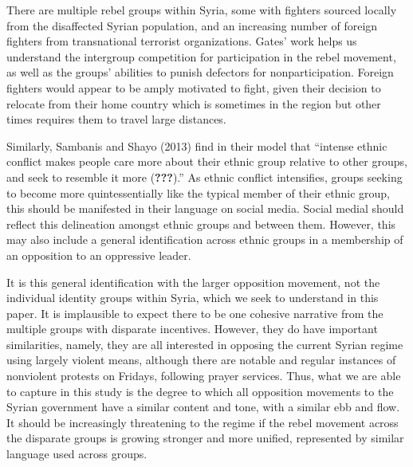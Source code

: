 \documentclass[english,man]{apa6}
\begin{document}
There are multiple rebel groups within Syria, some with fighters sourced locally from the disaffected Syrian population, and an increasing number of foreign fighters from transnational terrorist organizations. Gates' work helps us understand the intergroup competition for participation in the rebel movement, as well as the groups' abilities to punish defectors for nonparticipation. Foreign fighters would appear to be amply motivated to fight, given their decision to relocate from their home country which is sometimes in the region but other times requires them to travel large distances.

Similarly, Sambanis and Shayo (2013) find in their model that \enquote{intense ethnic conflict makes people care more about their ethnic group relative to other groups, and seek to resemble it more ({\textbf{???}}).} As ethnic conflict intensifies, groups seeking to become more quintessentially like the typical member of their ethnic group, this should be manifested in their language on social media. Social medial should reflect this delineation amongst ethnic groups and between them. However, this may also include a general identification across ethnic groups in a membership of an opposition to an oppressive leader.

It is this general identification with the larger opposition movement, not the individual identity groups within Syria, which we seek to understand in this paper. It is implausible to expect there to be one cohesive narrative from the multiple groups with disparate incentives. However, they do have important similarities, namely, they are all interested in opposing the current Syrian regime using largely violent means, although there are notable and regular instances of nonviolent protests on Fridays, following prayer services. Thus, what we are able to capture in this study is the degree to which all opposition movements to the Syrian government have a similar content and tone, with a similar ebb and flow. It should be increasingly threatening to the regime if the rebel movement across the disparate groups is growing stronger and more unified, represented by similar language used across groups.
\end{document}
